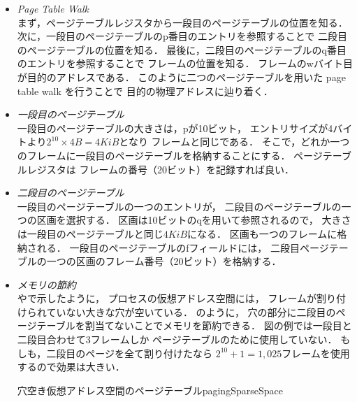 \begin{itemize}
\item \emph{Page Table Walk} \\
まず，ページテーブルレジスタから一段目のページテーブルの位置を知る．
次に，一段目のページテーブルのp番目のエントリを参照することで
二段目のページテーブルの位置を知る．
最後に，二段目のページテーブルのq番目のエントリを参照することで
フレームの位置を知る．
フレームのwバイト目が目的のアドレスである．
このように二つのページテーブルを用いた page table walk を行うことで
目的の物理アドレスに辿り着く．

\item \emph{一段目のページテーブル} \\
一段目のページテーブルの大きさは，pが10ビット，
エントリサイズが4バイトより$2^{10} \times 4B =4KiB$となり
フレームと同じである．
そこで，どれか一つのフレームに一段目のページテーブルを格納することにする．
ページテーブルレジスタは
フレームの番号（20ビット）を記録すれば良い．

\item \emph{二段目のページテーブル} \\
一段目のページテーブルの一つのエントリが，
二段目のページテーブルの一つの区画を選択する．
区画は10ビットのqを用いて参照されるので，
大きさは一段目のページテーブルと同じ$4KiB$になる．
区画も一つのフレームに格納される．
一段目のページテーブルのfフィールドには，
二段目ページテーブルの一つの区画のフレーム番号（20ビット）を格納する．

\item \emph{メモリの節約}\\
やで示したように，
プロセスの仮想アドレス空間には，
フレームが割り付けられていない大きな穴が空いている．
のように，
穴の部分に二段目のページテーブルを割当てないことでメモリを節約できる．
図の例では一段目と二段目合わせて3フレームしか
ページテーブルのために使用していない．
もしも，二段目のページを全て割り付けたなら
$2^{10}+1=1,025$フレームを使用するので効果は大きい．

{穴空き仮想アドレス空間のページテーブル}{pagingSparseSpace}
\end{itemize}

